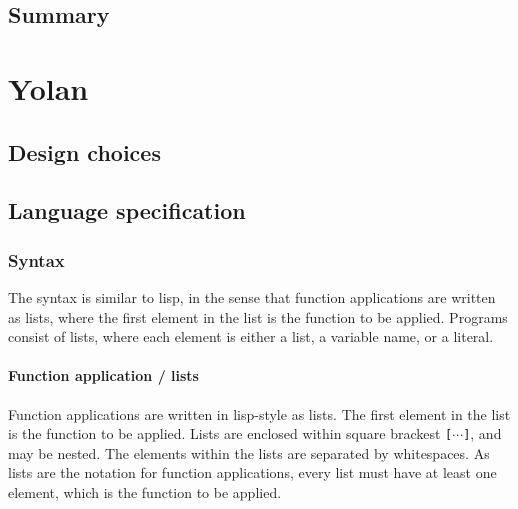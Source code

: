 \documentclass[11pt]{report}
\begin{document}
\section{Summary}
\chapter{Yolan}
\label{yolan}
\section{Design choices}
\begin{comment}
null-is-false
dynamic scope

... every expression yields a value, possibly false. Yes, you can bind a variable to the result of a false condition.

... lazy ffi.

\subsection{* Syntax}
A lisp-like syntax is choosen in order to simplify the parser and thereby reduce the code footprint.
Square brackets are used instead of parenthesis in order to indicate that the lists are not lisp-like cons-lists, but arrays. 

\section{* Implementation details}
\subsection{* AST rewriting}

\end{comment}


\section{Language specification}

\subsection{Syntax}
The syntax is similar to lisp, in the sense that function applications are written as lists, where the first element in the list is the function to be applied.
Programs consist of lists, where each element is either a list, a variable name, or a literal.

\subsubsection{Function application / lists}
Function applications are written in lisp-style as lists. The first element in the list is the function to be applied.
Lists are enclosed within square brackest \verb|[|$\cdots$\verb|]|, and may be nested. The elements within the lists are separated by whitespaces. 
As lists are the notation for function applications, every list must have at least one element, which is the function to be applied.
\end{document}

